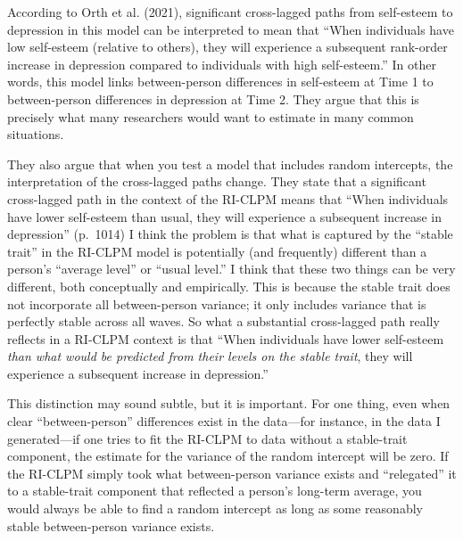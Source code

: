 \documentclass[
  english,
  man,floatsintext]{apa6}
\begin{document}
According to Orth et al. (2021), significant cross-lagged paths from self-esteem to depression in this model can be interpreted to mean that ``When individuals have low self-esteem (relative to others), they will experience a subsequent rank-order increase in depression compared to individuals with high self-esteem.'' In other words, this model links between-person differences in self-esteem at Time 1 to between-person differences in depression at Time 2. They argue that this is precisely what many researchers would want to estimate in many common situations.

They also argue that when you test a model that includes random intercepts, the interpretation of the cross-lagged paths change. They state that a significant cross-lagged path in the context of the RI-CLPM means that ``When individuals have lower self-esteem than usual, they will experience a subsequent increase in depression'' (p.~1014) I think the problem is that what is captured by the ``stable trait'' in the RI-CLPM model is potentially (and frequently) different than a person's ``average level'' or ``usual level.'' I think that these two things can be very different, both conceptually and empirically. This is because the stable trait does not incorporate all between-person variance; it only includes variance that is perfectly stable across all waves. So what a substantial cross-lagged path really reflects in a RI-CLPM context is that ``When individuals have lower self-esteem \emph{than what would be predicted from their levels on the stable trait}, they will experience a subsequent increase in depression.''

This distinction may sound subtle, but it is important. For one thing, even when clear ``between-person'' differences exist in the data---for instance, in the data I generated---if one tries to fit the RI-CLPM to data without a stable-trait component, the estimate for the variance of the random intercept will be zero. If the RI-CLPM simply took what between-person variance exists and ``relegated'' it to a stable-trait component that reflected a person's long-term average, you would always be able to find a random intercept as long as some reasonably stable between-person variance exists.
\end{document}
